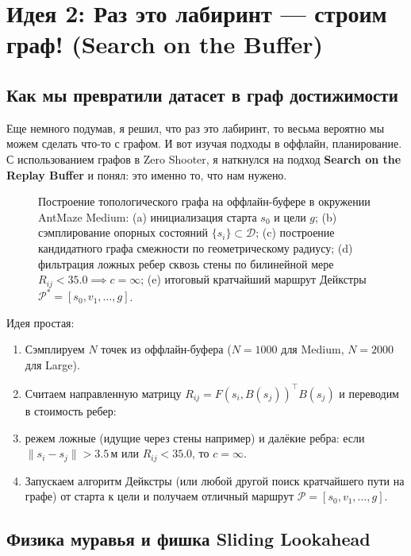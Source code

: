 \section{Идея 2: Раз это лабиринт — строим граф! (Search on the Buffer)}



\subsection{Как мы превратили датасет в граф достижимости}
Еще немного подумав, я решил, что раз это лабиринт, то весьма вероятно мы можем сделать что-то с графом.
И вот изучая подходы в оффлайн, планирование. С использованием графов в Zero Shooter, я наткнулся на подход \textbf{Search on the Replay Buffer} и понял: это именно то, что нам нужено.

\begin{figure}[t]
    \centering
    
    \caption{Построение топологического графа на оффлайн-буфере в окружении AntMaze Medium: (a) инициализация старта $s_0$ и цели $g$; (b) сэмплирование опорных состояний $\{s_i\} \subset \mathcal{D}$; (c) построение кандидатного графа смежности по геометрическому радиусу; (d) фильтрация ложных ребер сквозь стены по билинейной мере $R_{ij} < 35.0 \implies c = \infty$; (e) итоговый кратчайший маршрут Дейкстры $\mathcal{P}^* = [s_0, v_1, \dots, g]$.}
    \label{fig:search_on_buffer}
\end{figure}

Идея простая:
\begin{enumerate}[leftmargin=*,noitemsep]
    \item Сэмплируем $N$ точек из оффлайн-буфера ($N=1000$ для Medium, $N=2000$ для Large).
    \item Считаем направленную матрицу $R_{ij} = F(s_i, B(s_j))^\top B(s_j)$ и переводим в стоимость ребер:
    \item режем ложные (идущие через стены например) и далёкие ребра: если $\|s_i - s_j\| > 3.5\,\text{м}$ или $R_{ij} < 35.0$, то $c = \infty$.
    \item Запускаем алгоритм Дейкстры (или любой другой поиск кратчайшего пути на графе) от старта к цели и получаем отличный маршрут $\mathcal{P} = [s_0, v_1, \dots, g]$.
\end{enumerate}

\subsection{Физика муравья и фишка Sliding Lookahead}

